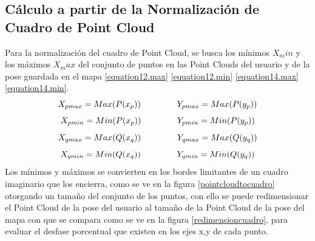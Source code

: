 \subsection{Cálculo a partir de la Normalización de Cuadro de Point Cloud}

Para la normalización del cuadro de Point Cloud, se busca los mínimos $X_min$ y los máximos $X_max$ del conjunto de puntos en las Point Clouds del usuario y de la pose guardada en el mapa \ref{equation12.max} \ref{equation12.min} \ref{equation14.max} \ref{equation14.min}.
\begin{equation}
X_{pmax} = Max(P(x_p)) \hspace{15mm} Y_{pmax} = Max(P(y_p))
\label{equation12.max}
\end{equation}
\begin{equation}
X_{pmin} = Min(P(x_p)) \hspace{15mm} Y_{pmin} = Min(P(y_p))
\label{equation12.min}
\end{equation}
\begin{equation}
X_{qmax} = Max(Q(x_q)) \hspace{15mm} Y_{qmax} = Max(Q(y_q))
\label{equation14.max}
\end{equation}
\begin{equation}
X_{qmin} = Min(Q(x_q)) \hspace{15mm} Y_{qmin} = Min(Q(y_q))
\label{equation14.min}
\end{equation}
Los mínimos y máximos se convierten en los bordes limitantes de un cuadro imaginario que los encierra, como se ve en la figura \ref{pointcloudtocuadro} otorgando un tamaño del conjunto de los puntos, con ello se puede redimensionar el Point Cloud de la pose del usuario al tamaño de la Point Cloud de la pose del mapa con que se compara como se ve en la figura \ref{redimensioncuadro}, para evaluar el desfase porcentual que existen en los ejes x,y de cada punto.

